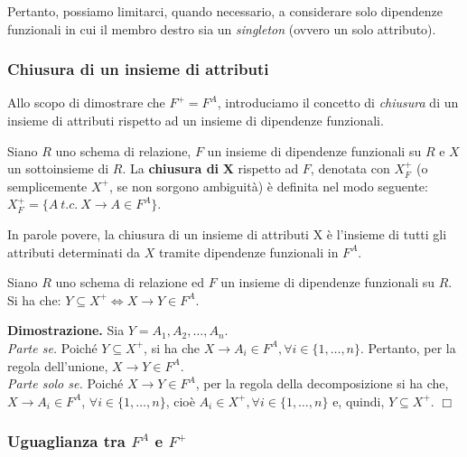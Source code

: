 Pertanto, possiamo limitarci, quando necessario, a considerare solo dipendenze funzionali in cui il
membro destro sia un \emph{singleton} (ovvero un solo attributo).

\subsubsection{Chiusura di un insieme di attributi}

Allo scopo di dimostrare che $F^+ = F^A$, introduciamo il concetto di \emph{chiusura} di un insieme di attributi
rispetto ad un insieme di dipendenze funzionali. 
\begin{defn}
Siano $R$ uno schema di relazione, $F$ un insieme di dipendenze funzionali su $R$ e $X$ un sottoinsieme di $R$.
La \textbf{chiusura di} $\mathbf{X}$ rispetto ad $F$, denotata con $X^+_F$ (o semplicemente $X^+$, se non sorgono ambiguità) è 
definita nel modo seguente: $X^+_F = \{A\ t.c.\ X \rightarrow A \in F^A\}$.
\end{defn}
In parole povere, la chiusura di un insieme di attributi X è l'insieme di tutti gli attributi determinati da $X$
tramite dipendenze funzionali in $F^A$.
\label{lemma4_1}
\begin{lem}
Siano $R$ uno schema di relazione ed $F$ un insieme di dipendenze funzionali su $R$. Si ha che:
$Y \subseteq X^+\Leftrightarrow X \rightarrow Y \in F^A$.
\end{lem}

\textbf{Dimostrazione.} Sia $Y = A_1, A_2, \ldots, A_n$.\\
\emph{Parte se.} Poiché $Y \subseteq X^+$, si ha che $X \rightarrow A_i \in F^A, \forall i \in \{1, \ldots, n\}$. 
Pertanto, per la regola dell'unione, $X \rightarrow Y \in F^A$.\\
\emph{Parte solo se.} Poiché $X \rightarrow Y \in F^A$, per la regola della decomposizione si ha che, 
$X \rightarrow A_i \in F^A$, $\forall i \in \{1, \ldots, n\}$, cioè $A_i \in X^+, \forall i \in \{1, \ldots, n\}$ 
e, quindi, $Y \subseteq X^+$. \hfill $\Box$

\subsubsection{Uguaglianza tra $F^A$ e $F^+$}

